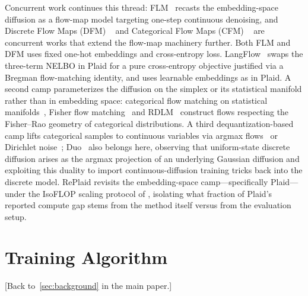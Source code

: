 \documentclass{article}
\begin{document}
Concurrent work continues this thread: FLM~\citep{lee2026flow} recasts the embedding-space diffusion as a flow-map model targeting one-step continuous denoising, and Discrete Flow Maps (DFM) ~\citep{potaptchik2026discrete} and Categorical Flow Maps (CFM) ~\citep{roos2026categorical} are concurrent works that extend the flow-map machinery further. Both FLM and DFM uses fixed one-hot embeddings and cross-entropy loss.  LangFlow~\citep{chen2026langflow} swaps the three-term NELBO in Plaid for a pure cross-entropy objective justified via a Bregman flow-matching identity, and uses learnable embeddings as in Plaid. A second camp parameterizes the diffusion on the simplex or its statistical manifold rather than in embedding space: categorical flow matching on statistical manifolds~\citep{cheng2024categorical}, Fisher flow matching~\citep{davis2024fisher} and RDLM~\citep{jo2025continuous} construct flows respecting the Fisher--Rao geometry of categorical distributions. A third dequantization-based camp lifts categorical samples to continuous variables via argmax flows~\citep{hoogeboom2021argmax} or Dirichlet noise~\citep{avdeyev2023dirichlet}; Duo~\citep{sahoo2025the} also belongs here, observing that uniform-state discrete diffusion arises as the argmax projection of an underlying Gaussian diffusion and exploiting this duality to import continuous-diffusion training tricks back into the discrete model. RePlaid revisits the embedding-space camp---specifically Plaid---under the IsoFLOP scaling protocol of \citet{nie2025scaling,sahoo2026scaling}, isolating what fraction of Plaid's reported compute gap stems from the method itself versus from the evaluation setup.

\clearpage

%
%

%


%

\section{Training Algorithm}
\label{supp:sec:training-algo}

[Back to~\cref{sec:background} in the main paper.]

%
\end{document}
